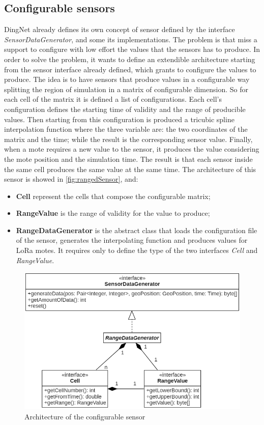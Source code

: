 \subsection*{Configurable sensors}
DingNet already defines its own concept of sensor defined by the interface \mbox{\textit{SensorDataGenerator}}, and some its implementations.
The problem is that miss a support to configure with low effort the values that the sensors has to produce.
In order to solve the problem, it wants to define an extendible architecture starting from the sensor interface already defined, which grants to configure the values to produce.
The idea is to have sensors that produce values in a configurable way splitting the region of simulation in a matrix of configurable dimension.
So for each cell of the matrix it is defined a list of configurations. 
Each cell's configuration defines the starting time of validity and the range of producible values. 
Then starting from this configuration is produced a tricubic spline interpolation function where the three variable are: the two coordinates of the matrix and the time; while the result is the corresponding sensor value.
Finally, when a mote requires a new value to the sensor, it produces the value considering the mote position and the simulation time.
The result is that each sensor inside the same cell produces the same value at the same time. 
The architecture of this sensor is showed in \autoref{fig:rangedSensor}, and:
\begin{itemize}
    \item \textbf{Cell} represent the cells that compose the configurable matrix;
    \item \textbf{RangeValue} is the range of validity for the value to produce;
    \item \textbf{RangeDataGenerator} is the abstract class that loads the configuration file of the sensor, generates the interpolating function and produces values for LoRa motes. It requires only to define the type of the two interfaces \textit{Cell} and \textit{RangeValue}.
\end{itemize}
% 
\begin{figure}[h]
    \centering
    \includegraphics[scale=0.8]{figures/rangedSensor.png}
    \caption{Architecture of the configurable sensor}
    \label{fig:rangedSensor}
\end{figure}
